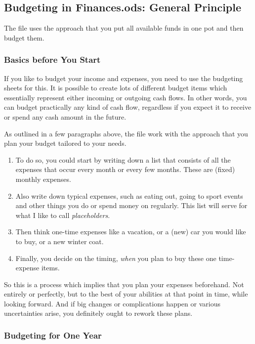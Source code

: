 \subsection{Budgeting in Finances.ods: General Principle}
\label{subsec:budgeting-in-finances.ods-general-principle}

The file uses the approach that you put all available funds in one pot and then budget them.

\subsubsection{Basics before You Start}
\label{subsubsec:budgeting-basics}

If you like to budget your income and expenses, you need to use the budgeting sheets for this.
It is possible to create lots of different budget items which essentially represent either incoming or outgoing cash flows.
In other words, you can budget practically any kind of cash flow, regardless if you expect it to receive or spend any cash amount in the future.

As outlined in a few paragraphs above, the file work with the approach that you plan your budget tailored to your needs.
\begin{enumerate}	
	\item To do so, you could start by writing down a list that consists of all the expenses that occur every month or every few months.
	These are (fixed) monthly expenses.
	\item Also write down typical expenses, such as eating out, going to sport events and other things you do or spend money on regularly.
	This list will serve for what I like to call \emph{placeholders}.
	\item Then think one-time expenses like a vacation, or a (new) car you would like to buy, or a new winter coat.
	\item Finally, you decide on the timing, \emph{when} you plan to buy these one time-expense items.
\end{enumerate}

So this is a process which implies that you plan your expenses beforehand.
Not entirely or perfectly, but to the best of your abilities at that point in time, while looking forward.
And if big changes or complications happen or various uncertainties arise, you definitely ought to rework these plans.

\subsubsection{Budgeting for One Year}
\label{subsubsec:budgeting-for-one-year}

